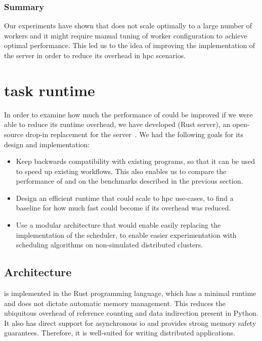 \subsubsection*{Summary}
Our experiments have shown that \dask{} does not scale optimally to a large
number of workers and it might require manual tuning of worker configuration to achieve optimal
performance. This led us to the idea of improving the implementation of the
\dask{} server in order to reduce its overhead in \gls{hpc}
scenarios.

\section{\rsds{} task runtime}
\label{sec:rsds-description}
In order to examine how much the performance of \dask{} could be improved if we
were able to reduce its runtime overhead, we have developed \rsds{} (Rust \dask{} server), an
open-source drop-in replacement for the \dask{}
server~\cite{rsds_github}. We had the following goals for its design and implementation:

\begin{itemize}
	\item Keep backwards compatibility with existing \dask{} programs, so that it can be
	      used to speed up existing workflows. This also enables us to compare the performance of
	      \rsds{} and \dask{} on the benchmarks described in the
	      previous section.
	\item Design an efficient runtime that could scale to \gls{hpc} use-cases, to find a
	      baseline for how much fast \dask{} could become if its overhead was reduced.
	\item Use a modular architecture that would enable easily replacing the implementation of the scheduler,
	      to enable easier experimentation with scheduling algorithms on non-simulated distributed clusters.
\end{itemize}

\subsection*{Architecture}
\rsds{} is implemented in the Rust programming language, which has a minimal
runtime and does not dictate automatic memory management. This reduces the ubiquitous overhead of
reference counting and data indirection present in Python. It also has direct support for
asynchronous \gls{io} and provides strong memory safety guarantees. Therefore,
it is well-suited for writing distributed applications.

